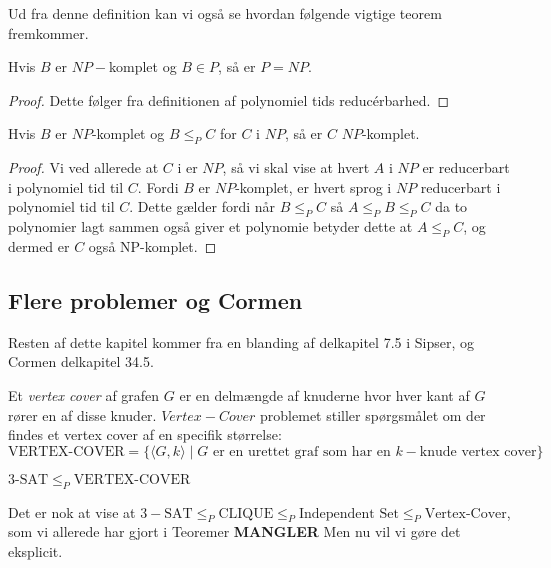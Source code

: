 Ud fra denne definition kan vi også se hvordan følgende vigtige teorem fremkommer.
\begin{theorem}
	Hvis $B$ er $NP-$komplet og $B \in P$, så er $P = NP$.
\end{theorem}

\begin{proof}
	Dette følger fra definitionen af polynomiel tids reducérbarhed.
\end{proof}

\begin{theorem}
	Hvis $B$ er $NP$-komplet og $B \le_{P} C$ for $C$ i $NP$, så er $C$ $NP$-komplet.
\end{theorem}

\begin{proof}
	Vi ved allerede at $C$ i er $NP$, så vi skal vise at hvert $A$ i $NP$ er reducerbart i polynomiel tid til $C$. Fordi $B$ er $NP$-komplet, er hvert sprog i $NP$ reducerbart i polynomiel tid til $C$. Dette gælder fordi når $B \le_{P} C$ så $A \le_{P} B \le_{P} C$ da to polynomier lagt sammen også giver et polynomie betyder dette at $A \leq_{P} C$, og dermed er $C$ også NP-komplet.
\end{proof}

\subsection{Flere problemer og Cormen}%
\label{subsec:7.5andcormen}

Resten af dette kapitel kommer fra en blanding af delkapitel 7.5 i Sipser, og Cormen delkapitel 34.5.

Et \textit{vertex cover} af grafen $G$ er en delmængde af knuderne hvor hver kant af $G$ rører en af disse knuder. $Vertex-Cover$ problemet stiller spørgsmålet om der findes et vertex cover af en specifik størrelse:
\begin{equation*}
\text{VERTEX-COVER} = \{ \langle G, k \rangle \mid G \text{ er en urettet graf som har en } k-\text{knude vertex cover}\}
\end{equation*}

\begin{theorem}
	$3 \text{-SAT} \le_P \text{VERTEX-COVER}$
\end{theorem}

Det er nok at vise at $3-\text{SAT} \le_{P} \text{CLIQUE} \le_{P} \text{Independent Set} \le_{P} \text{Vertex-Cover}$, som vi allerede har gjort i Teoremer \textbf{MANGLER} %
Men nu vil vi gøre det eksplicit.

